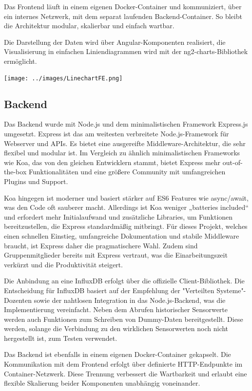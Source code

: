 Das Frontend läuft in einem eigenen Docker-Container und kommuniziert, 
über ein internes Netzwerk, mit dem separat laufenden Backend-Container. 
So bleibt die Architektur modular, skalierbar und einfach wartbar.

Die Darstellung der Daten wird über Angular-Komponenten realisiert,
die Visualisierung in einfachen Liniendiagrammen wird mit der ng2-charts-Bibliothek ermöglicht.
\begin{center}
  \texttt{[image: ../images/LinechartFE.png]}
\end{center}

\subsection{Backend}
Das Backend wurde mit Node.js und dem minimalistischen Framework Express.js umgesetzt. 
Express ist das am weitesten verbreitete Node.js-Framework für Webserver und APIs. 
Es bietet eine ausgereifte Middleware-Architektur, die sehr flexibel und modular ist. 
Im Vergleich zu ähnlich minimalistischen Frameworks wie Koa, 
das von den gleichen Entwicklern stammt, 
bietet Express mehr out-of-the-box Funktionalitäten und eine größere Community mit umfangreichen Plugins und Support. \cite{betterstack2025koavsexpress,appventurez2025nodejsframework}

Koa hingegen ist moderner und basiert stärker auf ES6 Features wie async/await, was den Code oft sauberer macht. 
Allerdings ist Koa weniger „batteries included“ und erfordert mehr Initialaufwand und zusätzliche Libraries, 
um Funktionen bereitzustellen, die Express standardmäßig mitbringt. 
Für dieses Projekt, welches einen schnellen Einstieg, umfangreiche Dokumentation und stabile Middleware braucht, 
ist Express daher die pragmatischere Wahl.
Zudem sind Gruppenmitglieder bereits mit Express vertraut, was die Einarbeitungszeit verkürzt und die Produktivität steigert. 

Die Anbindung an eine InfluxDB erfolgt über die offizielle Client-Bibliothek. Die Entscheidung für InfluxDB basiert auf der Empfehlung der "Verteilten Systeme"-Dozenten sowie der nahtlosen Integration in das Node.js-Backend, was die Implementierung vereinfacht.
Neben dem Abrufen historischer Sensorwerte werden auch Funktionen zum Schreiben von Dummy-Daten bereitgestellt.
Diese werden, solange die Verbindung zu den wirklichen Sensorwerten noch nicht hergestellt ist, zum Testen verwendet.

Das Backend ist ebenfalls in einem eigenen Docker-Container gekapselt. 
Die Kommunikation mit dem Frontend erfolgt über definierte HTTP-Endpunkte im Container-Netzwerk. 
Diese Trennung verbessert die Wartbarkeit und erlaubt eine flexible Skalierung beider Komponenten unabhängig voneinander.
